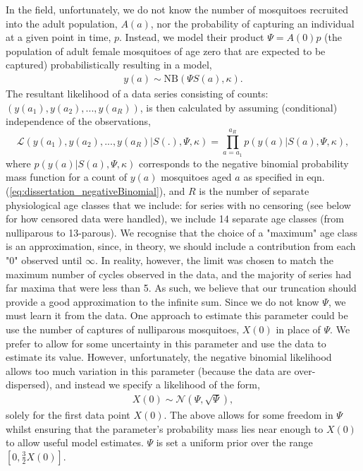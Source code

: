 \documentclass[12pt]{article}
\begin{document}
{In the field, unfortunately, we do not know the number of mosquitoes recruited into the adult population, $A(a)$, nor the probability of capturing an individual at a given point in time, $p$. Instead, we model their product $\Psi=A(0)p$ (the population of adult female mosquitoes of age zero that are expected to be captured) probabilistically resulting in a model,
%
\begin{align}\label{eq:dissertation_negativeBinomial}
y(a) \sim \text{NB}(\Psi S(a),\kappa).
\end{align}
%
The resultant likelihood of a data series consisting of counts: $(y(a_1),y(a_2),...,y(a_R))$, is then calculated by assuming (conditional) independence of the observations,
%
\begin{equation}
\mathcal{L}(y(a_1),y(a_2),...,y(a_R)|S(.),\Psi,\kappa) = \prod\limits_{a=a_1}^{a_R} p(y(a)|S(a),\Psi,\kappa),
\end{equation}
%
where $p(y(a)|S(a),\Psi,\kappa)$ corresponds to the negative binomial probability mass function for a count of $y(a)$ mosquitoes aged $a$ as specified in eqn. (\ref{eq:dissertation_negativeBinomial}), and $R$ is the number of separate physiological age classes that we include: for series with no censoring (see below for how censored data were handled), we include 14 separate age classes (from nulliparous to 13-parous). We recognise that the choice of a "maximum" age class is an approximation, since, in theory, we should include a contribution from each "0" observed until $\infty$. In reality, however, the limit was chosen to match the maximum number of cycles observed in the data, and the majority of series had far maxima that were less than 5. As such, we believe that our truncation should provide a good approximation to the infinite sum. 
%
Since we do not know $\Psi$, we must learn it from the data. One approach to estimate this parameter could be use the number of captures of nulliparous mosquitoes, $X(0)$ in place of $\Psi$. We prefer to allow for some uncertainty in this parameter and use the data to estimate its value. However, unfortunately, the negative binomial likelihood allows too much variation in this parameter (because the data are over-dispersed), and instead we specify a likelihood of the form,
%
\begin{align}
X(0) \sim \mathcal{N}(\Psi,\sqrt{\Psi}),
\end{align}
%
solely for the first data point $X(0)$. The above allows for some freedom in $\Psi$ whilst ensuring that the parameter's probability mass lies near enough to $X(0)$ to allow useful model estimates. $\Psi$ is set a uniform prior over the range $[0,\frac{3}{2}X(0)]$.

}
\end{document}
